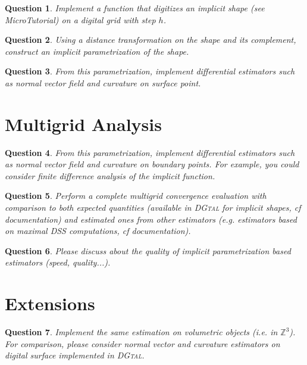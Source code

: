 \documentclass[a4paper, 11pt]{article}
\newtheorem{qu}{Question}
\begin{document}
\begin{qu}
  Implement a function that digitizes an implicit shape (see
  MicroTutorial) on a digital grid with  step $h$.
\end{qu}

\begin{qu}
  Using a distance transformation on the shape and its complement,
  construct an implicit parametrization of the shape.
\end{qu}


\begin{qu}
  From this parametrization, implement  differential estimators such
  as normal vector field and curvature on surface point.
\end{qu}


\section{Multigrid Analysis}

\begin{qu}
  From this parametrization, implement  differential estimators such
  as normal vector field and curvature on boundary points. For
  example, you could consider finite difference analysis of the
  implicit function.
\end{qu}


\begin{qu}
  Perform a complete multigrid convergence evaluation with comparison
  to both expected quantities (available in \textsc{DGtal} for
  implicit shapes, cf  documentation) and estimated ones from other
  estimators (\emph{e.g.} estimators based on maximal DSS
  computations, cf documentation).
\end{qu}

\begin{qu}
  Please discuss about the quality of implicit parametrization based
  estimators (speed, quality...).
\end{qu}

\section{Extensions}


\begin{qu}
  Implement the same estimation on volumetric objects (\emph{i.e.} in
  $\mathbb{Z}^3$). For comparison, please consider normal vector and
  curvature estimators on digital surface implemented in \textsc{DGtal}.  
\end{qu}
\end{document}
